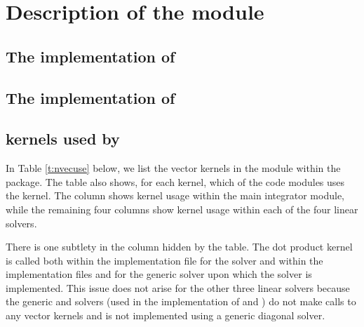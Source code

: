 \chapter{Description of the {\nvector} module}\label{s:nvector}


\section{The {\nvecs} implementation of {\nvector}}\label{ss:nvec_ser}


\section{The {\nvecp} implementation of {\nvector}}\label{ss:nvec_par}


\section{{\nvector} kernels used by {\cvode}}

In Table \ref{t:nvecuse} below, we list the vector kernels in the 
{\nvector} module within the {\cvode} package.
The table also shows, for each kernel, which of the code modules uses
the kernel. The {\cvode} column shows kernel usage within the main
integrator module, while the remaining four columns show kernel usage
within each of the four {\cvode} linear solvers. 

There is one subtlety in the {\cvspgmr} column hidden by the table. 
The dot product kernel  is called both within the 
implementation file  for the {\cvspgmr} solver and within 
the implementation files  and  for the generic {\spgmr} 
solver upon which the {\cvspgmr} solver is implemented. 
This issue does not arise for the other 
three {\cvode} linear solvers because the generic {\dense} and {\band} solvers 
(used in the implementation of {\cvdense} and {\cvband}) do not make calls to 
any vector kernels and {\cvdiag} is not implemented using a generic diagonal solver. 

